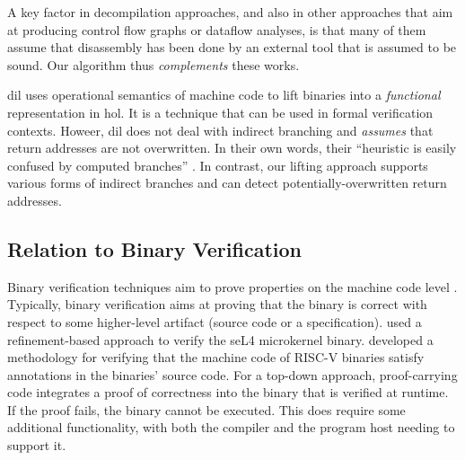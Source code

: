 A key factor in decompilation approaches, and also in other approaches that aim at producing control flow graphs or dataflow analyses, is that many of them assume that disassembly has been done by an external tool that is assumed to be sound.
Our algorithm thus \emph{complements} these works.

\Ac{dil} \autocite{myreen2007hoare,myreen2012decompilation}
uses operational semantics of machine code to lift binaries into a \emph{functional} representation in \ac{hol}.
It is a technique that can be used in formal verification contexts. %
Howeer, \ac{dil} does not deal with indirect branching and \emph{assumes} that return addresses are not overwritten.
In their own words, their ``heuristic is easily confused by computed branches'' \autocite{myreen2008decompilation}.
In contrast, our lifting approach supports various forms of indirect branches and can detect potentially-overwritten return addresses.

\subsection{Relation to Binary Verification}
Binary verification techniques aim to prove properties on the machine code level \autocite{kumar2018software}.
Typically, binary verification aims at proving that the binary is correct with respect to some higher-level artifact (source code or a specification).
\Textcite{klein2009sel4,klein2010refinement,sewell2013tvv} used a refinement-based approach to verify the seL4 microkernel binary.
\Textcite{kamkin2020deductive} developed a methodology for verifying that the machine code of RISC-V binaries satisfy annotations in the binaries' source code.
For a top-down approach, proof-carrying code \autocite{necula1997proof}
integrates a proof of correctness into the binary that is verified at runtime.
If the proof fails, the binary cannot be executed.
This does require some additional functionality, with both the compiler and the program host needing to support it.

